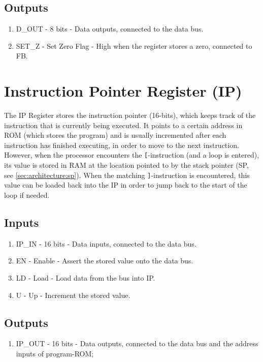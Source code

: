\subsection*{Outputs}
\begin{enumerate}
\itemsep0em 
\item D\_OUT - 8 bits - Data outputs, connected to the data bus.
\item SET\_Z - Set Zero Flag - High when the register stores a zero, connected to FB.
\end{enumerate}


\section{Instruction Pointer Register (IP)} \label{sec:architecture:ip}
The IP Register stores the instruction pointer (16-bits), which keeps track of the instruction that is currently being executed. It points to a certain address in ROM (which stores the program) and is usually incremented after each instruction has finished executing, in order to move to the next instruction. However, when the processor encounters the \texttt{[}-instruction (and a loop is entered), its value is stored in RAM at the location pointed to by the stack pointer (SP, see \ref{sec:architecture:sp}). When the matching \texttt{]}-instruction is encountered, this value can be loaded back into the IP in order to jump back to the start of the loop if needed.

\subsection*{Inputs}
\begin{enumerate}
\itemsep0em 
\item IP\_IN - 16 bits - Data inputs, connected to the data bus.
\item EN - Enable - Assert the stored value onto the data bus.
\item LD - Load - Load data from the bus into IP.
\item U - Up - Increment the stored value.
\end{enumerate}

\subsection*{Outputs}
\begin{enumerate}
\itemsep0em 
\item IP\_OUT - 16 bits - Data outputs, connected to the data bus and the address inputs of program-ROM;
\end{enumerate}


